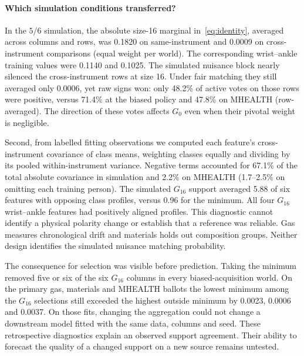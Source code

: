 \paragraph{Which simulation conditions transferred?}
In the $5/6$ simulation, the absolute size-16 marginal in~\eqref{eq:identity}, averaged across columns and rows, was 0.1820 on same-instrument and 0.0009 on cross-instrument comparisons (equal weight per world). The corresponding wrist--ankle training values were 0.1140 and 0.1025. The simulated nuisance block nearly silenced the cross-instrument rows at size 16. Under fair matching they still averaged only 0.0006, yet raw signs won: only 48.2\% of active votes on those rows were positive, versus 71.4\% at the biased policy and 47.8\% on MHEALTH (row-averaged). The direction of these votes affects $G_0$ even when their pivotal weight is negligible.

Second, from labelled fitting observations we computed each feature's cross-instrument covariance of class means, weighting classes equally and dividing by its pooled within-instrument variance. Negative terms accounted for 67.1\% of the total absolute covariance in simulation and 2.2\% on MHEALTH (1.7--2.5\% on omitting each training person). The simulated $G_{16}$ support averaged 5.88 of six features with opposing class profiles, versus 0.96 for the minimum. All four $G_{16}$ wrist--ankle features had positively aligned profiles. This diagnostic cannot identify a physical polarity change or establish that a reference was reliable. Gas measures chronological drift and materials holds out composition groups. Neither design identifies the simulated nuisance matching probability.

The consequence for selection was visible before prediction. Taking the minimum removed five or six of the six $G_{16}$ columns in every biased-acquisition world. On the primary gas, materials and MHEALTH ballots the lowest minimum among the $G_{16}$ selections still exceeded the highest outside minimum by 0.0023, 0.0006 and 0.0037. On those fits, changing the aggregation could not change a downstream model fitted with the same data, columns and seed. These retrospective diagnostics explain an observed support agreement. Their ability to forecast the quality of a changed support on a new source remains untested.
